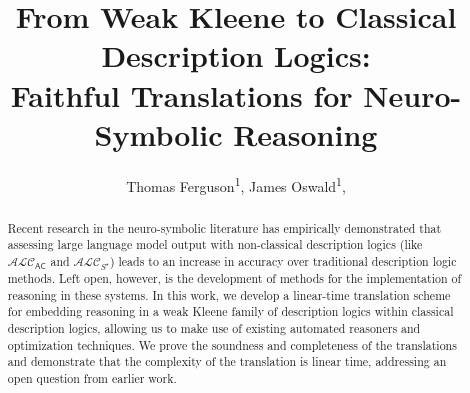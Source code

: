 \documentclass[letterpaper]{article} %
\title{From Weak Kleene to Classical Description Logics: \\Faithful Translations for Neuro-Symbolic Reasoning}
\author {
    Thomas Ferguson\textsuperscript{\rm 1},
    James Oswald\textsuperscript{\rm 1},
}
\theoremstyle{definition}
\theoremstyle{definition}
\theoremstyle{definition}
\theoremstyle{definition}
\theoremstyle{definition}
\begin{document}
\maketitle

\begin{abstract}

Recent research in the neuro-symbolic literature has empirically demonstrated that assessing large language model output with non-classical description logics (like $\mathcal{ALC}_\mathsf{AC}$ and $\mathcal{ALC}_{S^\star}$) leads to an increase in accuracy over traditional description logic methods. Left open, however, is the development of methods for the implementation of reasoning in these systems. In this work, we develop a linear-time translation scheme for embedding reasoning in a weak Kleene family of description logics within classical description logics, allowing us to make use of existing automated reasoners and optimization techniques. We prove the soundness and completeness of the translations and demonstrate that the complexity of the translation is linear time, addressing an open question from earlier work.




\end{abstract}

\end{document}
